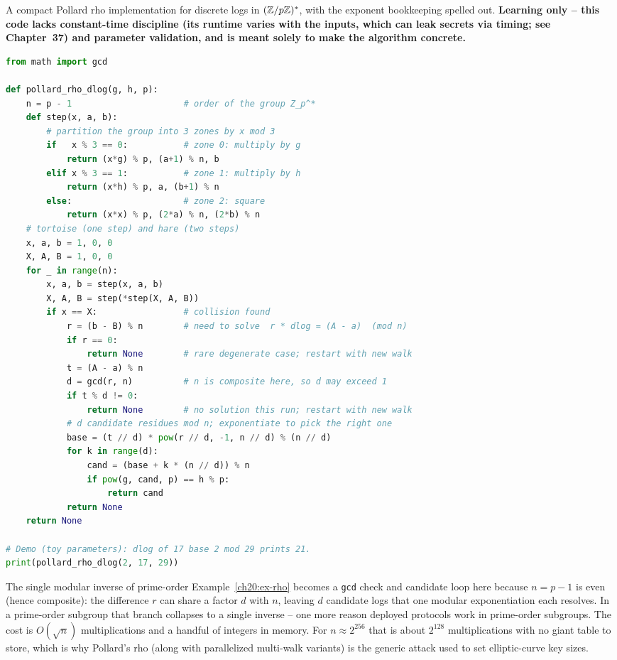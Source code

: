 \begin{implementbox}
A compact Pollard rho implementation for discrete logs in $(\mathbb{Z}/p\mathbb{Z})^{*}$, with the exponent bookkeeping spelled out.
\textbf{Learning only -- this code lacks constant-time discipline (its runtime varies with the inputs, which can leak secrets via timing; see Chapter~37) and parameter validation, and is meant solely to make the algorithm concrete.}
\begin{lstlisting}[language=Python]
from math import gcd

def pollard_rho_dlog(g, h, p):
    n = p - 1                      # order of the group Z_p^*
    def step(x, a, b):
        # partition the group into 3 zones by x mod 3
        if   x % 3 == 0:           # zone 0: multiply by g
            return (x*g) % p, (a+1) % n, b
        elif x % 3 == 1:           # zone 1: multiply by h
            return (x*h) % p, a, (b+1) % n
        else:                      # zone 2: square
            return (x*x) % p, (2*a) % n, (2*b) % n
    # tortoise (one step) and hare (two steps)
    x, a, b = 1, 0, 0
    X, A, B = 1, 0, 0
    for _ in range(n):
        x, a, b = step(x, a, b)
        X, A, B = step(*step(X, A, B))
        if x == X:                 # collision found
            r = (b - B) % n        # need to solve  r * dlog = (A - a)  (mod n)
            if r == 0:
                return None        # rare degenerate case; restart with new walk
            t = (A - a) % n
            d = gcd(r, n)          # n is composite here, so d may exceed 1
            if t % d != 0:
                return None        # no solution this run; restart with new walk
            # d candidate residues mod n; exponentiate to pick the right one
            base = (t // d) * pow(r // d, -1, n // d) % (n // d)
            for k in range(d):
                cand = (base + k * (n // d)) % n
                if pow(g, cand, p) == h % p:
                    return cand
            return None
    return None

# Demo (toy parameters): dlog of 17 base 2 mod 29 prints 21.
print(pollard_rho_dlog(2, 17, 29))
\end{lstlisting}
The single modular inverse of prime-order Example~\ref{ch20:ex-rho} becomes a \texttt{gcd}
check and candidate loop here because $n = p-1$ is even (hence composite): the difference $r$ can share a
factor $d$ with $n$, leaving $d$ candidate logs that one modular exponentiation each resolves. In a
prime-order subgroup that branch collapses to a single inverse -- one more reason deployed protocols work in prime-order subgroups. The cost is $O(\sqrt{n})$ multiplications and a handful of integers in memory. For $n \approx 2^{256}$ that is about $2^{128}$ multiplications with no giant table to store, which is why Pollard's rho (along with parallelized multi-walk variants) is the generic attack used to set elliptic-curve key sizes.
\end{implementbox}

